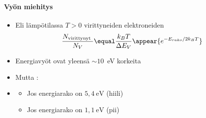 \begin{frame}
\frametitle{\texorpdfstring{\culine[\sectiontitleulinecolor]{\sectiontitle}}{\sectiontitle} }
\framesubtitle{Vyön miehitys}
\appear{}


\begin{itemize}
	\item Eli lämpötilassa $T>0$ virittyneiden elektroneiden 
\[
\frac{N_{\text {virittynyt }}}{N_{V}}  \equal  \frac{k_{B} T}{\Delta E_{V}} \appear{e^{-E_{rako} / 2 k_{B} T}}
\]
\item Energiavyöt ovat yleensä ${\sim}10$~eV korkeita 

\item Mutta :
\item[] \begin{itemize}
	\item Jos energiarako on $5,4 \mathrm{~eV}$ (hiili)
\item Jos energiarako on $1,1 \mathrm{~eV}$ (pii)
\end{itemize}

\end{itemize}


\endofslide 
\end{frame}

